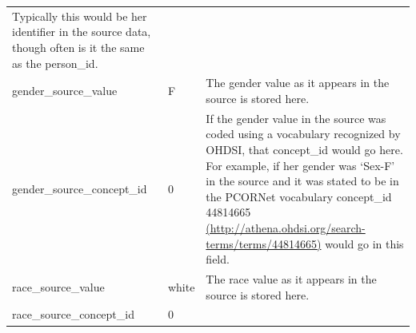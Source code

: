 \documentclass[]{book}
\begin{document}
\begin{longtable}[]{@{}lll@{}}
\begin{minipage}[t]{0.42\columnwidth}
Typically this would be her identifier in the source data, though often
is it the same as the person\_id.\strut
\end{minipage}\tabularnewline
\begin{minipage}[t]{0.33\columnwidth}\raggedright\strut
gender\_source\_value\strut
\end{minipage} & \begin{minipage}[t]{0.16\columnwidth}\raggedright\strut
F\strut
\end{minipage} & \begin{minipage}[t]{0.42\columnwidth}\raggedright\strut
The gender value as it appears in the source is stored here.\strut
\end{minipage}\tabularnewline
\begin{minipage}[t]{0.33\columnwidth}\raggedright\strut
gender\_source\_concept\_id\strut
\end{minipage} & \begin{minipage}[t]{0.16\columnwidth}\raggedright\strut
0\strut
\end{minipage} & \begin{minipage}[t]{0.42\columnwidth}\raggedright\strut
If the gender value in the source was coded using a vocabulary
recognized by OHDSI, that concept\_id would go here. For example, if her
gender was `Sex-F' in the source and it was stated to be in the PCORNet
vocabulary concept\_id 44814665
\href{http://athena.ohdsi.org/search-terms/terms/44814665}{(http://athena.ohdsi.org/search-terms/terms/44814665)}
would go in this field.\strut
\end{minipage}\tabularnewline
\begin{minipage}[t]{0.33\columnwidth}\raggedright\strut
race\_source\_value\strut
\end{minipage} & \begin{minipage}[t]{0.16\columnwidth}\raggedright\strut
white\strut
\end{minipage} & \begin{minipage}[t]{0.42\columnwidth}\raggedright\strut
The race value as it appears in the source is stored here.\strut
\end{minipage}\tabularnewline
\begin{minipage}[t]{0.33\columnwidth}\raggedright\strut
race\_source\_concept\_id\strut
\end{minipage} & \begin{minipage}[t]{0.16\columnwidth}\raggedright\strut
0\strut
\end{minipage} & \begin{minipage}[t]{0.42\columnwidth}\raggedright\strut

\end{minipage}
\end{longtable}
\end{document}
